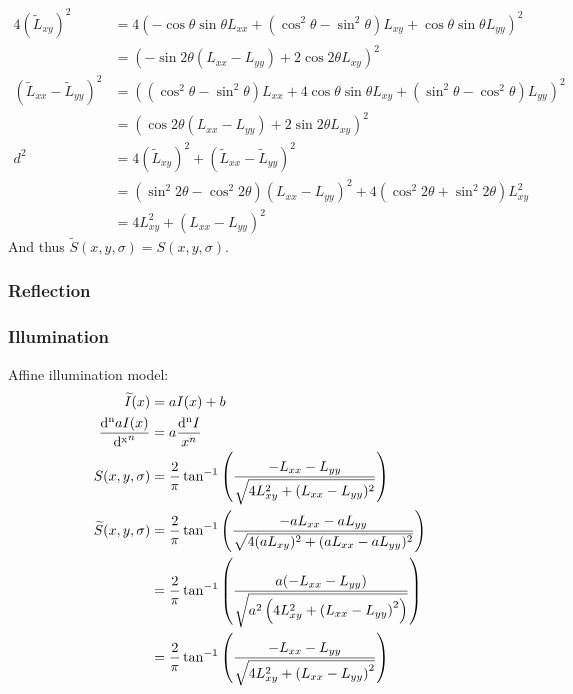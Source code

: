\documentclass[thesis.tex]{subfiles}
\begin{document}
\begin{align}
4(\widetilde{L}_{xy})^2 &= 4(-\cos \theta \sin \theta L_{xx} + (\cos^2 \theta - \sin^2 \theta) L_{xy} + \cos \theta \sin \theta L_{yy})^2 \\
&= (- \sin 2\theta (L_{xx} - L_{yy}) + 2 \cos 2\theta L_{xy})^2 \\
(\widetilde{L}_{xx} - \widetilde{L}_{yy})^2 &= ((\cos^2 \theta - \sin^2 \theta) L_{xx} + 4 \cos \theta \sin \theta L_{xy} + (\sin^2 \theta - \cos^2 \theta) L_{yy})^2 \\
&= (\cos 2\theta (L_{xx} - L_{yy}) + 2 \sin 2\theta L_{xy})^2 \\
d^2 &= 4(\widetilde{L}_{xy})^2 + (\widetilde{L}_{xx} - \widetilde{L}_{yy})^2 \\
&= (\sin^2 2\theta - \cos^2 2\theta) (L_{xx} - L_{yy})^2 + 4 (\cos^2 2\theta + \sin^2 2\theta) L_{xy}^2 \\
&= 4 L_{xy}^2 + (L_{xx} - L_{yy})^2
\end{align}
%
And thus $\widetilde{S}(x,y,\sigma) = S(x,y,\sigma)$.
%

\subsubsection{Reflection}

\subsubsection{Illumination}
Affine illumination model:
\begin{align}
  \widetilde{I}(x) &= a I(x)  + b \\
  \frac{\mathop{}\!\mathrm{d^n} a I(x)}{\mathop{}\!\mathrm{d^x}^n} &= a \frac{\mathop{}\!\mathrm{d^n}I}{ x^n} \\
  S(x,y,\sigma) &= \frac{2}{\pi} \tan^{-1} \left( \frac{-L_{xx} - L_{yy}}{\sqrt{4L_{xy}^2 + (L_{xx} - L_{yy})^2}} \right) \\
  \widetilde{S}(x,y,\sigma) &= \frac{2}{\pi} \tan^{-1} \left( \frac{-a L_{xx} - a L_{yy}}{\sqrt{4(aL_{xy})^2 + (aL_{xx} - aL_{yy})^2}} \right) \\
  &= \frac{2}{\pi} \tan^{-1} \left( \frac{a (-L_{xx} - L_{yy})}{\sqrt{a^2 \left(4L_{xy}^2 + \left(L_{xx} - L_{yy} \right)^2 \right)}} \right) \\
  &= \frac{2}{\pi} \tan^{-1} \left( \frac{-L_{xx} - L_{yy}}{\sqrt{4L_{xy}^2 + \left(L_{xx} - L_{yy} \right)^2}} \right) \\
\end{align}
\end{document}
